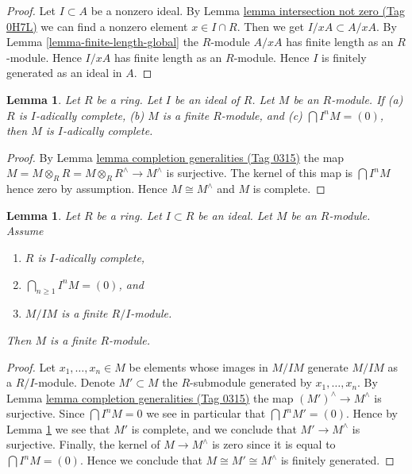 \documentclass{amsart}
\theoremstyle{plain}
\newtheorem{lemma}[subsection]{Lemma}
\theoremstyle{definition}
\theoremstyle{remark}
\numberwithin{equation}{subsection}
\begin{document}
\begin{proof}
Let $I \subset A$ be a nonzero ideal. By
Lemma \href{https://stacks.math.columbia.edu/tag/0H7L}{lemma intersection not zero (Tag 0H7L)}
we can find a nonzero element $x \in I \cap R$.
Then we get $I/xA \subset A/xA$. By Lemma \ref{lemma-finite-length-global}
the $R$-module $A/xA$ has finite length as an $R$-module. Hence
$I/xA$ has finite length as an $R$-module. Hence $I$ is finitely
generated as an ideal in $A$.
\end{proof}


\begin{lemma}
\label{lemma-when-finite-module-complete-over-complete-ring}
Let $R$ be a ring. Let $I$ be an ideal of $R$.
Let $M$ be an $R$-module.
If (a) $R$ is $I$-adically complete, (b) $M$ is a finite $R$-module,
and (c) $\bigcap I^nM = (0)$, then $M$ is $I$-adically complete.
\end{lemma}

\begin{proof}
By Lemma \href{https://stacks.math.columbia.edu/tag/0315}{lemma completion generalities (Tag 0315)}
the map $M = M \otimes_R R = M \otimes_R R^\wedge \to M^\wedge$
is surjective. The kernel of this map is $\bigcap I^nM$ hence zero
by assumption. Hence $M \cong M^\wedge$ and $M$ is complete.
\end{proof}


\begin{lemma}
\label{lemma-finite-over-complete-ring}
Let $R$ be a ring. Let $I \subset R$ be an ideal. Let $M$ be an $R$-module.
Assume
\begin{enumerate}
\item $R$ is $I$-adically complete,
\item $\bigcap_{n \geq 1} I^nM = (0)$, and
\item $M/IM$ is a finite $R/I$-module.
\end{enumerate}
Then $M$ is a finite $R$-module.
\end{lemma}

\begin{proof}
Let $x_1, \ldots, x_n \in M$ be elements whose images in $M/IM$ generate
$M/IM$ as a $R/I$-module. Denote $M' \subset M$ the $R$-submodule
generated by $x_1, \ldots, x_n$. By Lemma \href{https://stacks.math.columbia.edu/tag/0315}{lemma completion generalities (Tag 0315)}
the map $(M')^\wedge \to M^\wedge$ is surjective.
Since $\bigcap I^nM = 0$ we see in particular that $\bigcap I^nM' = (0)$.
Hence by Lemma \ref{lemma-when-finite-module-complete-over-complete-ring}
we see that $M'$ is complete, and we conclude that $M' \to M^\wedge$
is surjective. Finally, the kernel of $M \to M^\wedge$ is
zero since it is equal to $\bigcap I^nM = (0)$.
Hence we conclude that $M \cong M' \cong M^\wedge$
is finitely generated.
\end{proof}
\end{document}
